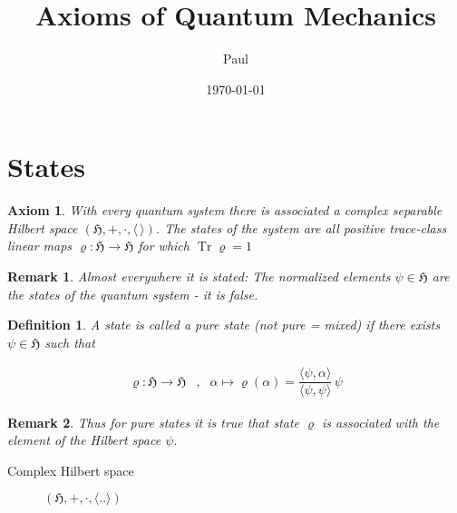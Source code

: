 \documentclass{article}
\title{Axioms of Quantum Mechanics}
\author{Paul}
\date{\today}
\newtheorem{axiom}{Axiom}
\newtheorem{definition}{Definition}
\newtheorem{remark}{Remark}
\DeclareMathOperator{\tr}{Tr}
\begin{document}
\maketitle

\section{States}

\begin{axiom}
With every quantum system there is associated a complex separable Hilbert space $(\mathfrak{H}, +, \cdot, \langle\,\rangle)$. The states of the system are all positive trace-class linear maps $\varrho:\mathfrak{H}\rightarrow\mathfrak{H}$ for which $\tr\varrho = 1$
\end{axiom}

\begin{remark}
Almost everywhere it is stated:
The normalized elements $\psi\in\mathfrak{H}$ are the states of the quantum system - it is false.
\end{remark}

\begin{definition}
A state is called a pure state (not pure = mixed) if there exists $\psi\in\mathfrak{H}$ such that

\begin{align*}
\varrho:\mathfrak{H}\rightarrow\mathfrak{H} & , & \alpha \mapsto \varrho(\alpha) = \dfrac{\langle\psi,\alpha\rangle}{\langle\psi,\psi\rangle}\,\psi
\end{align*}

\end{definition}

\begin{remark}
Thus for pure states it is true that state $\varrho$ is associated with the element of the Hilbert space $\psi$.
\end{remark}

\begin{description}
\item[Complex Hilbert space] $(\mathfrak{H}, +, \cdot, \langle..\rangle)$
\end{description}
\end{document}
